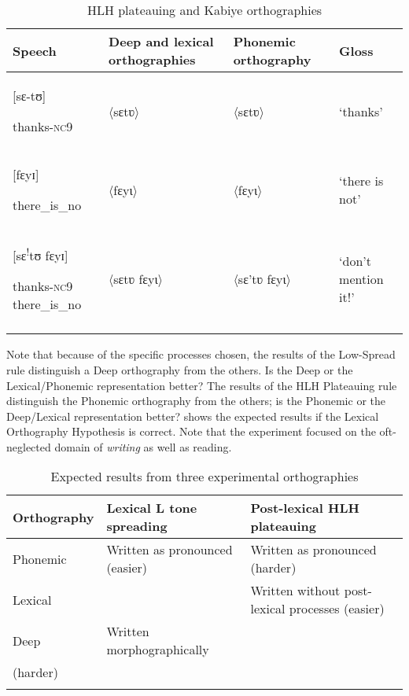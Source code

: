 \documentclass[output=paper]{langscibook}
\begin{document}


\begin{table}
    \begin{tabularx}{\textwidth}{QQQl}
    \lsptoprule
    Speech & Deep and lexical orthographies & Phonemic orthography & Gloss\\\midrule
    {[sɛ-tʊ]} 

    thanks-\textsc{nc9} & 〈sɛtʋ〉 & 〈sɛtʋ〉 & ‘thanks’\\
    {[fɛyɪ]}

    there\_is\_no & 〈fɛyɩ〉 & 〈fɛyɩ〉 & ‘there is not’\\
    {[sɛ\textsuperscript{!}tʊ fɛyɪ]}

    thanks-\textsc{nc9} there\_is\_no & 〈sɛtʋ fɛyɩ〉 & 〈sɛ’tʋ fɛyɩ〉 & ‘don’t mention it!’\\
    \lspbottomrule
    \end{tabularx}
    \caption{HLH plateauing and Kabiye orthographies}
    \label{tab:cahill:20}
\end{table}

Note that because of the specific processes chosen, the results of the Low-Spread rule distinguish a Deep orthography from the others. Is the Deep or the Lexical/Phonemic representation better? The results of the HLH Plateauing rule distinguish the Phonemic orthography from the others; is the Phonemic or the Deep/Lexical representation better?  shows the expected results if the Lexical Orthography Hypothesis is correct. Note that the experiment focused on the oft-neglected domain of \textit{writing} as well as reading.

\begin{table}
    \begin{tabularx}{\textwidth}{llQ}
    \lsptoprule

    Orthography & Lexical L tone spreading & Post-lexical HLH plateauing\\\midrule
    Phonemic & {Written as pronounced}     (easier) & {Written as pronounced}    (harder)\\\tablevspace
    {Lexical} &  & {Written without post-lexical processes} (easier)\\\tablevspace
    {Deep}  & Written morphographically \\  (harder) & \\
    \lspbottomrule
    \end{tabularx}
    \caption{Expected results from three experimental orthographies}
    \label{tab:cahill:21}
\end{table}
\end{document}
